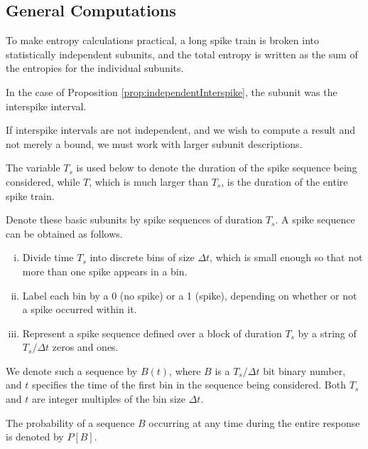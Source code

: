 \subsection{General Computations}

\begin{frm}
  To make entropy calculations practical, a long spike train is broken into statistically independent subunits, and the total entropy is written as the sum of the entropies for the individual subunits.
\end{frm}

\begin{exm}
  In the case of Proposition \ref{prop:independentInterspike}, the subunit was the interspike interval.
\end{exm}

\begin{rem}
  If interspike intervals are not independent, and we wish to compute a result and not merely a bound, we must work with larger subunit descriptions.
\end{rem}

\begin{ntn}
  The variable $T_s$ is used below to denote the duration of the spike sequence being considered, while $T$, which is much larger than $T_s$, is the duration of the entire spike train.
\end{ntn}

\begin{frm}
  Denote these basic subunits by spike sequences of duration $T_s$. A spike sequence can be obtained as follows.
  \begin{enumerate}[(i)]
  \item Divide time $T_{s}$ into discrete bins of size $\Delta t$, which is small enough so that not more than one spike appears in a bin.
  \item Label each bin by a 0 (no spike) or a 1 (spike), depending on whether or not a spike occurred within it.
  \item Represent a spike sequence defined over a block of duration $T_s$ by a string of $T_s/\Delta t$ zeros and ones.
  \end{enumerate}
  We denote such a sequence by $B(t)$, where $B$ is a $T_s/\Delta t$ bit binary number, and $t$ specifies the time of the first bin in the sequence being considered. Both $T_s$ and $t$ are integer multiples of the bin size $\Delta t$.
\end{frm}

\begin{ntn}
  The probability of a sequence $B$ occurring at any time during the entire response is denoted by $P[B]$.
\end{ntn}

